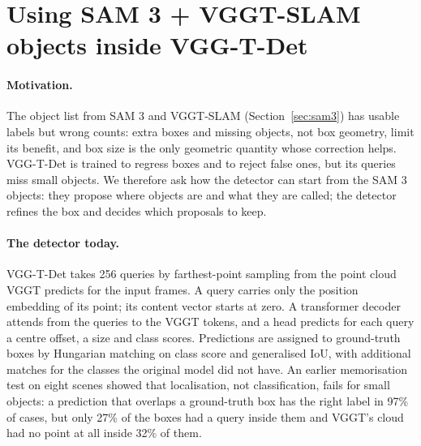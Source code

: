 
\section{Using SAM 3 + VGGT-SLAM objects inside VGG-T-Det}
\label{sec:vggtdet-arch}

\paragraph{Motivation.}
The object list from SAM 3 and VGGT-SLAM (Section~\ref{sec:sam3}) has usable labels but wrong counts: extra
boxes and missing objects, not box geometry, limit its benefit, and box size is the only geometric quantity
whose correction helps. VGG-T-Det is trained to regress boxes and to reject false ones, but its queries miss
small objects. We therefore ask how the detector can start from
the SAM 3 objects: they propose where objects are and what they are called; the detector refines the box and
decides which proposals to keep.

\paragraph{The detector today.}
VGG-T-Det takes 256 queries by farthest-point sampling from the point cloud VGGT predicts for the input frames.
A query carries only the position embedding of its point; its content vector starts at zero. A transformer
decoder attends from the queries to the VGGT tokens, and a head predicts for each query a centre offset, a size
and class scores. Predictions are assigned to ground-truth boxes by Hungarian matching on class score and
generalised IoU, with additional matches for the classes the original model did not have.
An earlier memorisation test on eight scenes showed that localisation, not classification, fails for small
objects: a prediction that overlaps a ground-truth box has the right label in 97\% of cases, but only 27\% of the
boxes had a query inside them and VGGT's cloud had no point at all inside 32\% of them.

